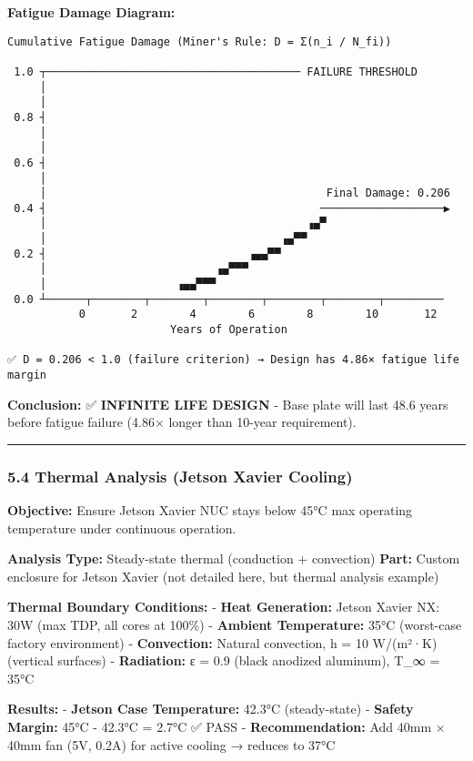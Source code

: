 \documentclass[
]{article}
\begin{document}
\textbf{Fatigue Damage Diagram:}

\begin{verbatim}
Cumulative Fatigue Damage (Miner's Rule: D = Σ(n_i / N_fi))

 1.0 ┬─────────────────────────────────────── FAILURE THRESHOLD
     │
     │
 0.8 ┤
     │
     │
 0.6 ┤
     │
     │                                           Final Damage: 0.206
 0.4 ┤                                          ───────────────────▶
     │                                        ▗▄▀
     │                                    ▗▄▀▀
 0.2 ┤                               ▗▄▄▀▀
     │                          ▗▄▀▀▀
     │                    ▗▄▄▀▀▀
 0.0 ┴──────┬────────┬────────┬────────┬────────┬────────┬─────────
           0       2        4        6        8        10       12
                         Years of Operation

✅ D = 0.206 < 1.0 (failure criterion) → Design has 4.86× fatigue life margin
\end{verbatim}

\textbf{Conclusion:} ✅ \textbf{INFINITE LIFE DESIGN} - Base plate will
last 48.6 years before fatigue failure (4.86× longer than 10-year
requirement).

\begin{center}\rule{0.5\linewidth}{0.5pt}\end{center}

\hypertarget{thermal-analysis-jetson-xavier-cooling}{%
\subsubsection{5.4 Thermal Analysis (Jetson Xavier
Cooling)}\label{thermal-analysis-jetson-xavier-cooling}}

\textbf{Objective:} Ensure Jetson Xavier NUC stays below 45°C max
operating temperature under continuous operation.

\textbf{Analysis Type:} Steady-state thermal (conduction + convection)
\textbf{Part:} Custom enclosure for Jetson Xavier (not detailed here,
but thermal analysis example)

\textbf{Thermal Boundary Conditions:} - \textbf{Heat Generation:} Jetson
Xavier NX: 30W (max TDP, all cores at 100\%) - \textbf{Ambient
Temperature:} 35°C (worst-case factory environment) -
\textbf{Convection:} Natural convection, h = 10 W/(m²·K) (vertical
surfaces) - \textbf{Radiation:} ε = 0.9 (black anodized aluminum), T\_∞
= 35°C

\textbf{Results:} - \textbf{Jetson Case Temperature:} 42.3°C
(steady-state) - \textbf{Safety Margin:} 45°C - 42.3°C = 2.7°C ✅ PASS -
\textbf{Recommendation:} Add 40mm × 40mm fan (5V, 0.2A) for active
cooling → reduces to 37°C
\end{document}
